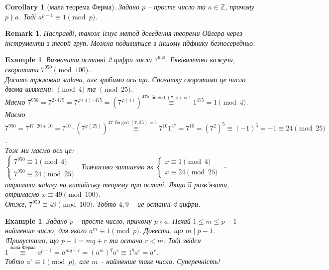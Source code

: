 \documentclass[a4paper, 10pt]{article}
\theoremstyle{theoremdd}
\theoremstyle{theoremdd}
\theoremstyle{theoremdd}
\theoremstyle{theoremdd}
\newtheorem{example}[theorem]{Example}
\theoremstyle{theoremdd}
\theoremstyle{theoremdd}
\newtheorem{remark}[theorem]{Remark}
\theoremstyle{theoremdd}
\theoremstyle{theoremdd}
\newtheorem{corollary}[theorem]{Corollary}
\begin{document}
\begin{corollary}[мала теорема Ферма]
Задано $p$ -- просте число та $a \in \mathbb{Z}$, причому $p \nmid a$. Тоді $a^{p-1} \equiv 1 \pmod p$.
\end{corollary}

\begin{remark}
Насправді, також існує метод доведення теореми Ойлера через інструменти з теорії груп. Можна подивитися в іншому пдфнику безпосередньо.
\end{remark}

\begin{example}
Визначити останні 2 цифри числа $7^{950}$. Еквівалетно кажучи, скоротити $7^{950} \pmod {100}$.\\
Досить трюковна задача, але зробимо ось що. Спочатку скоротимо це число двома шляхами: $\!\!\pmod 4$ та $\!\!\pmod {25}$.\\
Маємо $7^{950} = 7^{2 \cdot 475} = 7^{\varphi(4) \cdot 475} = (7^{\varphi(4)})^{475} \overset{\text{бо} \gcd(7,4) = 1}{\equiv} 1^{475} = 1 \pmod 4$.\\
Маємо $7^{950} = 7^{47 \cdot 20 + 10} = 7^{10} \cdot (7^{\varphi(25)})^{47} \overset{\text{бо} \gcd(7,25) = 1}{\equiv} 7^{10} 1^{47} = 7^{10} = (7^2)^5 \equiv (-1)^5 = -1 \equiv 24 \pmod {25}$.\\
Тож ми маємо ось це:\\
$\begin{cases}
7^{950} \equiv 1 \pmod 4 \\
7^{950} \equiv 24 \pmod {25} 
\end{cases}$. Тимчасово запишемо як $\begin{cases}
x \equiv 1 \pmod 4 \\
x \equiv 24 \pmod {25} 
\end{cases}$ -- отримали задачу на китайську теорему про остачі. Якщо її розв'язати, отримаємо $x \equiv 49 \pmod {100}$.\\
Отже, $7^{950} \equiv 49 \pmod {100}$. Тобто $4,9$ -- це останні 2 цифри.
\end{example}

\begin{example}
Задано $p$ -- просте число, причому $p \nmid a$. Нехай $1 \leq  m \leq p-1$ -- найменше число, для якого $a^m \equiv 1 \pmod p$. Довести, що $m \mid p-1$.\\
!Припустимо, що $p-1 = mq + r$ та остача $r < m$. Тоді звідси\\
$1 \overset{\text{мала Ферма}}{\equiv} a^{p-1} = a^{mq+r} = (a^m)^q a^r \equiv 1^q a^r = a^r$.\\
Тобто $a^{r} \equiv 1 \pmod p$, але $m$ -- найменше таке число. Суперечність!
\end{example}
\end{document}

